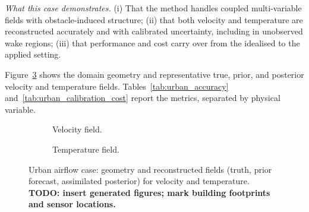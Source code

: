 \emph{What this case demonstrates.} (i) That the method handles coupled multi-variable fields with obstacle-induced structure; (ii) that both velocity and temperature are reconstructed accurately and with calibrated uncertainty, including in unobserved wake regions; (iii) that performance and cost carry over from the idealised to the applied setting.

Figure~\ref{fig:urban_fields} shows the domain geometry and representative true, prior, and posterior velocity and temperature fields. Tables~\ref{tab:urban_accuracy} and~\ref{tab:urban_calibration_cost} report the metrics, separated by physical variable.

\begin{figure}[ht]
    \centering
    \begin{subfigure}{0.48\linewidth}\centering
        \caption{Velocity field.}\label{fig:urban_vel}
    \end{subfigure}\hfill
    \begin{subfigure}{0.48\linewidth}\centering
        \caption{Temperature field.}\label{fig:urban_temp}
    \end{subfigure}
    \caption{Urban airflow case: geometry and reconstructed fields (truth, prior forecast, assimilated posterior) for velocity and temperature. \textbf{TODO: insert generated figures; mark building footprints and sensor locations.}}
    \label{fig:urban_fields}
\end{figure}

